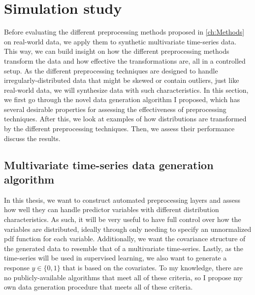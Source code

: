 \documentclass{statsmsc}
\begin{document}
{%

\section{Simulation study}%
\label{sec:Simulation study}%

Before evaluating the different preprocessing methods proposed in \cref{ch:Methods} on real-world
data, we apply them to synthetic multivariate time-series data. This way, we can build
insight on how the different preprocessing methods transform the data and how effective the
transformations are, all in a controlled setup. As the different preprocessing techniques are
designed to handle irregularly-distributed data that might be skewed or contain outliers, just like
real-world data, we will synthesize data with such characteristics.
In this section, we first go through the novel data generation algorithm I proposed, which
has several desirable properties for assessing the effectiveness of preprocessing
techniques. After this, we look at examples of how distributions
are transformed by the different preprocessing techniques. Then, we assess
their performance discuss the results.



\subsection{Multivariate time-series data generation algorithm}%
\label{sub:data_gen}

In this thesis, we want to construct automated preprocessing layers and assess how well
they can handle predictor variables with different distribution
characteristics. As such, it will be very useful to have full control over how
the variables are distributed, ideally through only needing to specify an
unnormalized \ac{pdf} function for each variable.  Additionally, we
want the covariance structure of the generated data to resemble that of a
multivariate time-series. Lastly, as the time-series will be used in supervised
learning, we also want to generate a response $y \in \{0,1\}$ that is based on the
covariates. To my knowledge, there are no publicly-available
algorithms that meet all of these criteria, so I propose my own
data generation procedure that meets all of these criteria.

}
\end{document}
